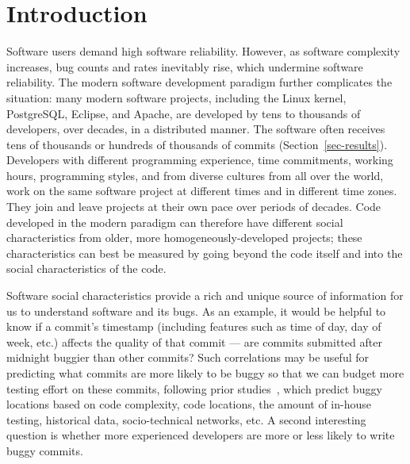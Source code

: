  

\section{Introduction}

Software users demand high software reliability. However, as software complexity
increases, bug counts and rates inevitably rise, which undermine software
reliability. The modern software development paradigm further complicates the
situation: many modern software projects, including the Linux kernel,
PostgreSQL, Eclipse, and Apache, are developed by tens to thousands of
developers, over decades, in a distributed manner. The software often receives
tens of thousands or hundreds of thousands of commits
(Section~\ref{sec-results}). Developers with different programming experience,
time commitments, working hours, programming
styles, and from diverse cultures from all over the world, work on the same
software project at different times and in different time zones. They join and
leave projects at their own pace over periods of decades. Code developed in the
modern paradigm can therefore have different social characteristics from older,
more homogeneously-developed projects; these characteristics can best be
measured by going beyond the code itself and into the social characteristics of
the code.

Software social characteristics provide a rich and unique source of information
for us to understand software and its bugs. As an example, it would be helpful
to know if a commit's timestamp (including features such as time of day, day of
week, etc.) affects the quality of that commit --- are commits submitted after
midnight buggier than other commits? Such correlations may be useful for
predicting what commits are more likely to be buggy so that we can budget more
testing effort on these commits, following prior
studies~\cite{graves00predicting, guo04robust, Hassan09, libre07, devNetwork08,
 predictionMenzies10, effort03, ostrand05predicting, depGraph08,
 zimmermann-promise-2007}, which predict buggy locations based on code
complexity, code locations, the amount of in-house testing, historical data,
socio-technical networks, etc. A second interesting question is whether more
experienced developers are more or less likely to write buggy commits.



